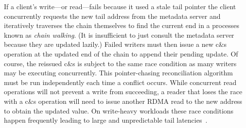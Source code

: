 If a client's write---or read---fails because it used a stale tail pointer
the client concurrently requests the new tail address from the metadata
server and iteratively traverses the chain themselves to find the current end
in a processes known as \emph{chain walking}. (It is insufficient to just
consult the metadata server because they are updated lazily.) Failed writers
must then issue a new c\&s operation at the updated end of the chain to
append their pending update. Of course, the reissued c\&s is subject to the
same race condition as many writers may be executing concurrently. This
pointer-chasing reconciliation algorithm must be run independently each time
a conflict occurs.
While concurrent read operations will not prevent a write from succeeding, a
reader that loses the race with a c\&s operation will need to issue another
RDMA read to the new address to obtain the updated value. On write-heavy
workloads these race conditions happen frequently
leading to large and unpredictable tail latencies~\cite[Table 2]{clover}.








